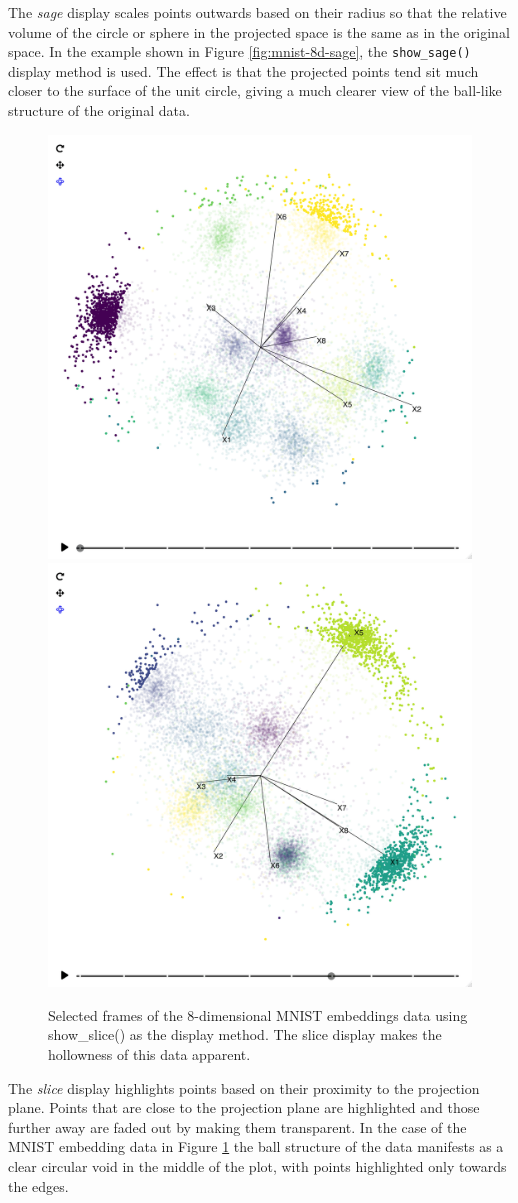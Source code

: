 The \emph{sage} display scales points outwards based on their radius so that the relative volume of the circle or sphere in the projected space is the same as in the original space. In the example shown in Figure \ref{fig:mnist-8d-sage}, the \texttt{show\_sage()} display method is used. The effect is that the projected points tend sit much closer to the surface of the unit circle, giving a much clearer view of the ball-like structure of the original data.

\begin{figure}

{\centering \includegraphics[width=0.49\linewidth]{figures/mnist/mnist-8d-slice-1} \includegraphics[width=0.49\linewidth]{figures/mnist/mnist-8d-slice-2} 

}

\caption{Selected frames of the 8-dimensional MNIST embeddings data using show\_slice() as the display method. The slice display makes the hollowness of this data apparent.}\label{fig:mnist-8d-slice}
\end{figure}

The \emph{slice} display highlights points based on their proximity to the projection plane. Points that are close to the projection plane are highlighted and those further away are faded out by making them transparent. In the case of the MNIST embedding data in Figure \ref{fig:mnist-8d-slice} the ball structure of the data manifests as a clear circular void in the middle of the plot, with points highlighted only towards the edges.

